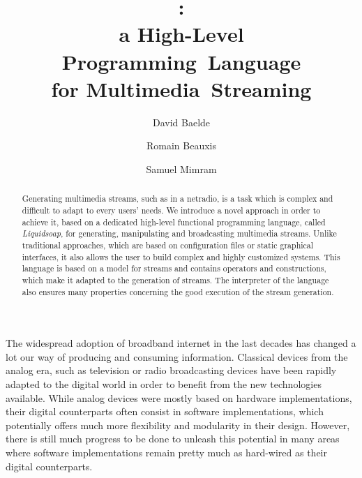 \documentclass{llncs}
\title{\liquidsoap{}:\\
  a High-Level Programming~Language\\
  for Multimedia~Streaming}
\author{David Baelde\inst{1} \and Romain Beauxis\inst{2} \and Samuel Mimram\inst{3}}
\institute{
  University of Minnesota, USA
  \and
  Department of Mathematics, Tulane University, USA
  \and
  CEA LIST -- LMeASI, France
}
\newcommand{\liquidsoap}{Liquidsoap}
\begin{document}
\maketitle


\begin{abstract}
  Generating multimedia streams, such as in a netradio, is a task which is
  complex and difficult to adapt to every users' needs. We introduce a novel
  approach in order to achieve it, based on a dedicated high-level functional
  programming language, called \emph{\liquidsoap{}}, for generating,
  manipulating and broadcasting multimedia streams. Unlike traditional
  approaches, which are based on configuration files or static graphical
  interfaces, it also allows the user to build complex and highly customized
  systems. This language is based on a model for streams and contains operators
  and constructions, which make it adapted to the generation of streams. The
  interpreter of the language also ensures many properties concerning the good
  execution of the stream generation.
\end{abstract}

The widespread adoption of broadband internet in the last decades has
changed a lot our way of producing and consuming information. Classical
devices from the analog era, such as television or radio broadcasting devices
have been rapidly adapted to the digital world in order to benefit from the new
technologies available. While analog devices were mostly based on hardware
implementations, their digital counterparts often consist in software
implementations,
which potentially offers much more flexibility and modularity in their design.
However, there is still much progress to be done to unleash this
potential in many areas where software implementations remain pretty much as
hard-wired as their digital counterparts.
\end{document}
